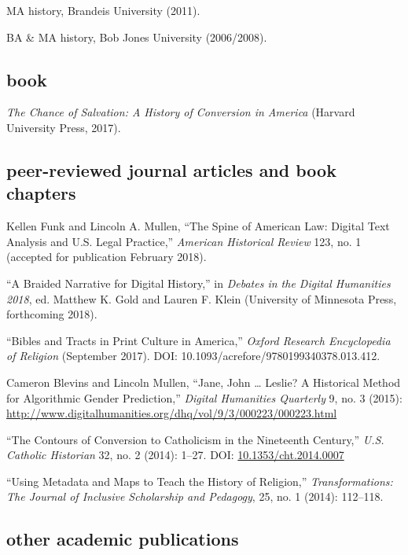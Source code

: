 \documentclass[11pt]{article}
\begin{document}
MA history, Brandeis University (2011).

BA \& MA history, Bob Jones University (2006/2008).

\subsection{book}\label{books}

\emph{The Chance of Salvation: A History of Conversion in America} (Harvard 
University Press, 2017).

\subsection{peer-reviewed journal articles and book chapters}\label{peer-reviewed}

Kellen Funk and Lincoln A. Mullen, ``The Spine of American Law: Digital Text 
Analysis and U.S. Legal Practice,'' \emph{American Historical Review} 123, no. 1 (accepted for publication February 2018). 

``A Braided Narrative for Digital History,'' in \emph{Debates in the Digital 
  Humanities 2018}, ed. Matthew K. Gold and Lauren F. Klein (University of 
Minnesota Press, forthcoming 2018).

``Bibles and Tracts in Print Culture in America,'' \emph{Oxford 
  Research Encyclopedia of Religion} (September 2017). DOI: 
10.1093/acrefore/9780199340378.013.412.

Cameron Blevins and Lincoln Mullen, ``Jane, John \ldots{} Leslie? A
Historical Method for Algorithmic Gender Prediction,'' \emph{Digital
  Humanities Quarterly} 9, no. 3 (2015): 
\url{http://www.digitalhumanities.org/dhq/vol/9/3/000223/000223.html}

``The Contours of Conversion to Catholicism in the Nineteenth Century,''
\emph{U.S. Catholic Historian} 32, no. 2 (2014): 1--27. DOI:
\href{http://dx.doi.org/10.1353/cht.2014.0007}{10.1353/cht.2014.0007}

``Using Metadata and Maps to Teach the History of Religion,''
\emph{Transformations: The Journal of Inclusive Scholarship and
  Pedagogy}, 25, no. 1 (2014): 112--118.


\subsection{other academic publications}\label{other-academic}
\end{document}
